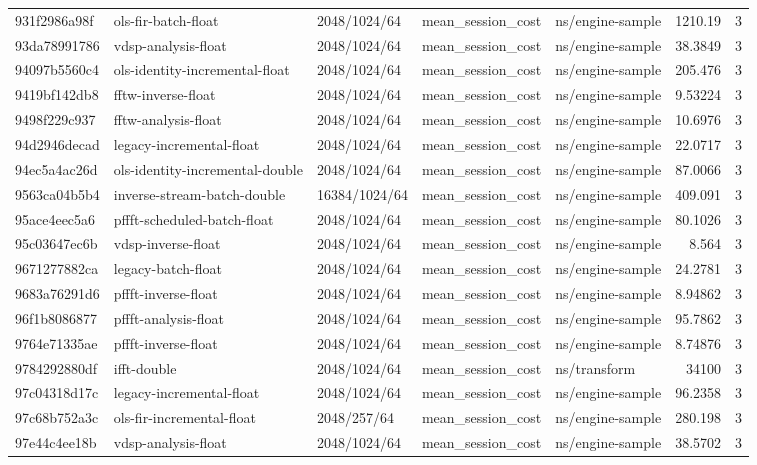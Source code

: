 \begin{longtable}{lllllrr}
931f2986a98f & ols-fir-batch-float & 2048/1024/64 & mean\_session\_cost & ns/engine-sample & 1210.19 & 3 \\
93da78991786 & vdsp-analysis-float & 2048/1024/64 & mean\_session\_cost & ns/engine-sample & 38.3849 & 3 \\
94097b5560c4 & ols-identity-incremental-float & 2048/1024/64 & mean\_session\_cost & ns/engine-sample & 205.476 & 3 \\
9419bf142db8 & fftw-inverse-float & 2048/1024/64 & mean\_session\_cost & ns/engine-sample & 9.53224 & 3 \\
9498f229c937 & fftw-analysis-float & 2048/1024/64 & mean\_session\_cost & ns/engine-sample & 10.6976 & 3 \\
94d2946decad & legacy-incremental-float & 2048/1024/64 & mean\_session\_cost & ns/engine-sample & 22.0717 & 3 \\
94ec5a4ac26d & ols-identity-incremental-double & 2048/1024/64 & mean\_session\_cost & ns/engine-sample & 87.0066 & 3 \\
9563ca04b5b4 & inverse-stream-batch-double & 16384/1024/64 & mean\_session\_cost & ns/engine-sample & 409.091 & 3 \\
95ace4eec5a6 & pffft-scheduled-batch-float & 2048/1024/64 & mean\_session\_cost & ns/engine-sample & 80.1026 & 3 \\
95c03647ec6b & vdsp-inverse-float & 2048/1024/64 & mean\_session\_cost & ns/engine-sample & 8.564 & 3 \\
9671277882ca & legacy-batch-float & 2048/1024/64 & mean\_session\_cost & ns/engine-sample & 24.2781 & 3 \\
9683a76291d6 & pffft-inverse-float & 2048/1024/64 & mean\_session\_cost & ns/engine-sample & 8.94862 & 3 \\
96f1b8086877 & pffft-analysis-float & 2048/1024/64 & mean\_session\_cost & ns/engine-sample & 95.7862 & 3 \\
9764e71335ae & pffft-inverse-float & 2048/1024/64 & mean\_session\_cost & ns/engine-sample & 8.74876 & 3 \\
9784292880df & ifft-double & 2048/1024/64 & mean\_session\_cost & ns/transform & 34100 & 3 \\
97c04318d17c & legacy-incremental-float & 2048/1024/64 & mean\_session\_cost & ns/engine-sample & 96.2358 & 3 \\
97c68b752a3c & ols-fir-incremental-float & 2048/257/64 & mean\_session\_cost & ns/engine-sample & 280.198 & 3 \\
97e44c4ee18b & vdsp-analysis-float & 2048/1024/64 & mean\_session\_cost & ns/engine-sample & 38.5702 & 3 \\

\end{longtable}

